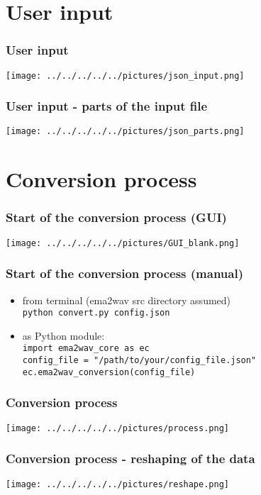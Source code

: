 \documentclass[12pt,a4paper]{beamer}
\begin{document}
\section{User input}
\begin{frame}
    \frametitle{User input}
    \centering
    \texttt{[image: ../../../../../pictures/json\_input.png]}
\end{frame}

\begin{frame}
    \frametitle{User input - parts of the input file}
    \centering
    \texttt{[image: ../../../../../pictures/json\_parts.png]}
\end{frame}

\section{Conversion process}
\begin{frame}
    \frametitle{Start of the conversion process (GUI)}
    \centering
    \texttt{[image: ../../../../../pictures/GUI\_blank.png]}
\end{frame}

\begin{frame}
    \frametitle{Start of the conversion process (manual)}
    \begin{itemize}
        \item from terminal (ema2wav src directory assumed)\\
        \texttt{python convert.py config.json}
        \item as Python module:\\
        \texttt{import ema2wav\_core as ec}\\
        \texttt{config\_file = "/path/to/your/config\_file.json"}\\
        \texttt{ec.ema2wav\_conversion(config\_file)}
    \end{itemize}
\end{frame}

\begin{frame}
    \frametitle{Conversion process}
    \centering
    \texttt{[image: ../../../../../pictures/process.png]}
\end{frame}

\begin{frame}
    \frametitle{Conversion process - reshaping of the data}
    \centering
    \texttt{[image: ../../../../../pictures/reshape.png]}
\end{frame}
\end{document}
